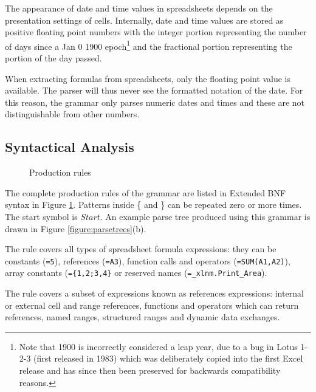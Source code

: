 The appearance of date and time values in spreadsheets depends on the presentation settings of cells. Internally, date and time values are stored as positive floating point numbers with the integer portion representing the number of days since a Jan 0 1900 epoch\footnote{Note that 1900 is incorrectly considered a leap year, due to a bug in Lotus 1-2-3 (first released in 1983) which was deliberately copied into the first Excel release and has since then been preserved for backwards compatibility reasons.} and the fractional portion representing the portion of the day passed.

When extracting formulas from spreadsheets, only the floating point value is available.
The parser will thus never see the formatted notation of the date.
For this reason, the grammar only parses numeric dates and times and these are not distinguishable from other numbers.

\subsection{Syntactical Analysis}

\begin{figure}
\small
\begin{multicols*}{2}

\end{multicols*}
\caption{Production rules}
\label{figure:productions}
\end{figure}

The complete production rules of the grammar are listed in Extended BNF syntax in Figure \ref{figure:productions}.
Patterns inside \{ and \} can be repeated zero or more times.
The start symbol is $Start$. An example parse tree produced using this grammar is drawn in Figure \ref{figure:parsetrees}(b).

The  rule covers all types of spreadsheet formula expressions: they can be constants (\texttt{=5}), references (\texttt{=A3}), function calls and operators (\texttt{=SUM(A1,A2)}), array constants (\texttt{=\{1,2;3,4\}} or reserved names (\texttt{=_xlnm.Print_Area}).

The  rule covers a subset of expressions known as references expressions: internal or external cell and range references, functions and operators which can return references, named ranges, structured ranges and dynamic data exchanges.

%	
%
%	

